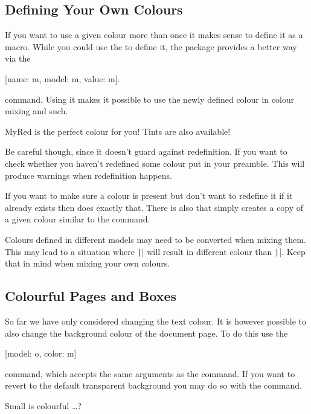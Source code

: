 \subsection{Defining Your Own Colours}

If you want to use a given colour more than once it makes sense to define
it as a macro. While you could use the  to define it,
the  package provides a better way via the
\begin{lscommand}
  [name: m, model: m, value: m].
\end{lscommand}
command. Using it makes it possible to use the newly defined colour in colour
mixing and such.
\begin{example}
\textcolor{MyRed}{MyRed is
  the perfect colour for you!}
\textcolor{MyRed!60}{Tints
  are also available!}
\end{example}
Be careful though, since it doesn't guard against redefinition. If you want to
check whether you haven't redefined some colour put  in your
preamble. This will produce warnings when redefinition happens.

If you want to make sure a colour is present but don't want to redefine it if it
already exists then  does exactly that. There is also
 that simply creates a copy of a given colour similar to the
 command.

Colours defined in different models may need to be converted when mixing them.
This may lead to a situation where \texttt|\color{a!75!b}| will
result in different colour than \texttt|\color{b!25!a}|. Keep that in
mind when mixing your own colours.

\subsection{Colourful Pages and Boxes}

So far we have only considered changing the text colour. It is however possible
to also change the background colour of the document page. To do this use the
\begin{lscommand}
  [model: o, color: m]
\end{lscommand}
command, which accepts the same arguments as the  command. If you
want to revert to the default transparent background you may do so with the
 command.
\begin{example}[standalone, paperheight=1cm]
\usepackage{xcolor} %
\pagecolor{orange} \color{-orange}
Small is colourful \ldots?
\end{example}


